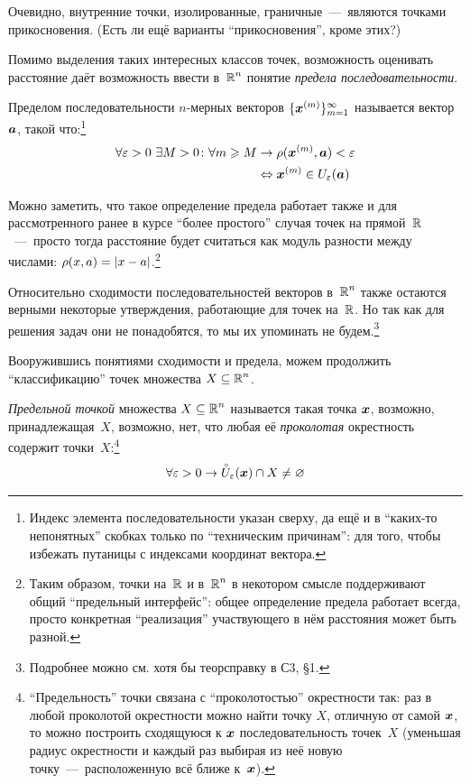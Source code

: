 \documentclass[a4paper,12pt]{article}
\renewcommand{\mathring}[1]{\accentset{\circ}{#1}}
\begin{document}
  Очевидно, внутренние точки, изолированные, граничные~---~являются точками прикосновения.
  (Есть ли ещё варианты ``прикосновения'', кроме этих?)

  Помимо выделения таких интересных классов точек, возможность оценивать расстояние даёт возможность ввести в~$\operatorname{\mathbb R}^n$ понятие \emph{предела последовательности}.

  Пределом последовательности $n$-мерных векторов $\{\boldsymbol x^{(m)}\}_{m = 1}^\infty$ называется вектор $\boldsymbol a$, такой что:\footnote{
    Индекс элемента последовательности указан сверху, да ещё и в ``каких-то непонятных'' скобках только по ``техническим причинам'': для того, чтобы избежать путаницы с индексами координат вектора.
  }
  \begin{equation}\label{eq:seq-limit}
  \begin{split}
    \forall \varepsilon > 0\ \exists M > 0\colon \forall m \geqslant M &\to \rho(\boldsymbol x^{(m)}, \boldsymbol a) < \varepsilon\\
      &\Leftrightarrow \boldsymbol x^{(m)} \in U_{\varepsilon}(\boldsymbol a)
  \end{split}
  \end{equation}

  Можно заметить, что такое определение предела работает также и для рассмотренного ранее в курсе ``более простого'' случая точек на прямой~$\operatorname{\mathbb R}$~---~просто тогда расстояние будет считаться как модуль разности между числами: $\rho(x, a) \hm= |x - a|$.\footnote{
    Таким образом, точки на~$\operatorname{\mathbb R}$ и в~$\operatorname{\mathbb R}^n$ в некотором смысле поддерживают общий ``предельный интерфейс'': общее определение предела работает всегда, просто конкретная ``реализация'' участвующего в нём расстояния может быть разной.
  }

  Относительно сходимости последовательностей векторов в~$\operatorname{\mathbb R}^n$ также остаются верными некоторые утверждения, работающие для точек на~$\operatorname{\mathbb R}$.
  Но так как для решения задач они не понадобятся, то мы их упоминать не будем.\footnote{
    Подробнее можно см. хотя бы теорсправку в С3, \S 1.
  }

  Вооружившись понятиями сходимости и предела, можем продолжить ``классификацию'' точек множества $X \hm\subseteq \RR^n$.

  \begin{definition}
    \emph{Предельной точкой} множества $X \subseteq \operatorname{\mathbb R}^n$ называется такая точка $\boldsymbol x$, возможно, принадлежащая~$X$, возможно, нет, что любая её \emph{проколотая} окрестность содержит точки~$X$:\footnote{
      ``Предельность'' точки связана с ``проколотостью'' окрестности так: раз в любой проколотой окрестности можно найти точку $X$, отличную от самой $\boldsymbol x$, то можно построить сходящуюся к $\boldsymbol x$ последовательность точек~$X$ (уменьшая радиус окрестности и каждый раз выбирая из неё новую точку~---~расположенную всё ближе к~$\boldsymbol x$).
    }
    \[
      \forall \eps > 0 \to \mathring U_{\eps}(\bds x) \cap X \not= \noth
    \]
  \end{definition}
\end{document}
